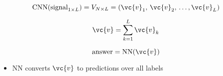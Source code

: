 






\begin{equation*}
	\text{CNN}(\text{signal}_{1\times L}) = V_{N\times L} = (\vc{v}_1,\, \vc{v}_2,\, \ldots, \vc{v}_L)
\end{equation*}

\begin{equation*}
	\vc{v} = \sum_{k=1}^L \vc{v}_k
\end{equation*}

\begin{equation*}
	\text{answer} = \text{NN}(\vc{v})
\end{equation*}

\begin{itemize}
	\item NN converts $\vc{v}$ to predictions over all labels
\end{itemize}

